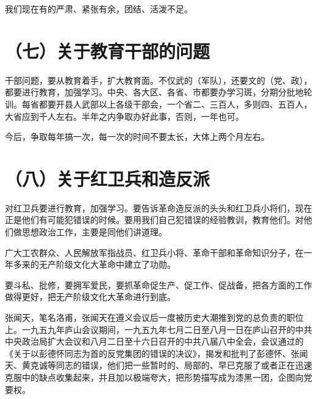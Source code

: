 我们现在有的严肃、紧张有余，团结、活泼不足。

\section{（七）关于教育干部的问题}

干部问题，要从教育着手，扩大教育面。不仅武的（军队），还要文的（党、政），都要进行教育，加强学习。中央、各大区、各省、市都要办学习斑，分期分批地轮训。每省都要开县人武部以上各级干部会，一个省二、三百人，多则四、五百人，大省应到千人左右。半年之内争取办好此事，否则，一年也可。

今后，争取每年搞一次，每一次的时间不要太长，大体上两个月左右。

\section{（八）关于红卫兵和造反派}

对红卫兵要进行教育，加强学习。要告诉革命造反派的头头和红卫兵小将们，现在正是他们有可能犯错误的时候。要用我们自己犯错误的经验教训，教育他们。对他们做思想政治工作，主要是同他们讲道理。

广大工农群众、人民解放军指战员、红卫兵小将、革命干部和革命知识分子，在一年多来的无产阶级文化大革命中建立了功勋。

要斗私、批修，要拥军爱民，要抓革命促生产、促工作、促战备，把各方面的工作做得更好，把无产阶级文化大革命进行到底。

\begin{maonote}
张闻天，笔名洛甫，张闻天在遵义会议后一度被历史大潮推到党的总负责的职位上。一九五九年庐山会议期间，一九五九年七月二日至八月一日在庐山召开的中共中央政治局扩大会议和八月二日至十六日召开的中共八届八中全会，会议通过的《关于以彭德怀同志为首的反党集团的错误的决议》，揭发和批判了彭德怀、张闻天、黄克诚等同志的错误，他们把一些暂时的、局部的、早已克服了或者正在迅速克服中的缺点收集起来，并且加以极端夸大，把形势描写成为漆黑一团，企图向党要权。
\end{maonote}
